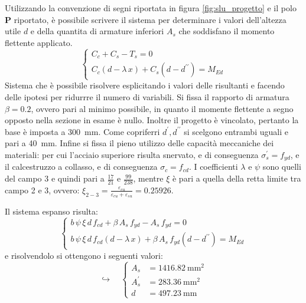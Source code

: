 Utilizzando la convenzione di segni riportata in figura \ref{fig:slu_progetto} e il polo $\mathbf{P}$ riportato, è possibile scrivere il sistema per determinare i valori dell'altezza utile $d$ e della quantita di armature inferiori $A_s$ che soddisfano il momento flettente applicato. 
\begin{equation}
  \begin{cases}
    C_c + C_s - T_s = 0 \\
    C_c \left(d - \lambda\,x\right) + C_s \left(d - d^{\prime\prime}\right) = M_{Ed}
  \end{cases}
\end{equation}
Sistema che è possibile risolvere esplicitando i valori delle risultanti e facendo delle ipotesi per ridurrre il numero di variabili. 
Si fissa il rapporto di armatura $\beta = 0.2$, ovvero pari al minimo possibile, in quanto il momente flettente a segno opposto nella sezione in esame è nullo.
Inoltre il progetto è vincolato, pertanto la base è imposta a \SI{300}{\milli\metre}.
Come copriferri $d^\prime,d^{\prime\prime}$ si scelgono entrambi uguali e pari a \SI{40}{\milli\metre}.
Infine si fissa il pieno utilizzo delle capacità meccaniche dei materiali: per cui l'acciaio superiore risulta snervato, e di conseguenza $\sigma_s^\prime = f_{yd}$, e il calcestruzzo a collasso, e di conseguenza $\sigma_c = f_{cd}$.
I coefficienti $\lambda$ e $\psi$ sono quelli del campo 3 e quindi pari a $\frac{17}{21}$ e $\frac{99}{238}$, mentre $\xi$ è pari a quella della retta limite tra campo 2 e 3, ovvero: $\xi_{2-3} = \frac{\varepsilon_{cu}}{\varepsilon_{cu} + \varepsilon_{su}} = \num{0.25926}$.

Il sistema espanso risulta:
\begin{equation}
  \begin{cases}
    b \, \psi \, \xi \, d \, f_{cd} + \beta \, A_s \, f_{yd} - A_s \, f_{yd} = 0 \\
    b \, \psi \, \xi \, d \, f_{cd} \left(d - \lambda\,x\right) + \beta \, A_s \, f_{yd} \left(d - d^{\prime\prime}\right) = M_{Ed}
  \end{cases}
\label{eq:sistemaSLU}
\end{equation}
e risolvendolo si ottengono i seguenti valori:
\begin{equation}
  \hookrightarrow \quad
  \begin{cases}
    A_s &= \SI{1416.82}{\milli\metre\squared} \\
    A_s^\prime &= \SI{283.36}{\milli\metre\squared} \\
    d &= \SI{497.23}{\milli\metre}
  \end{cases}
\end{equation}

